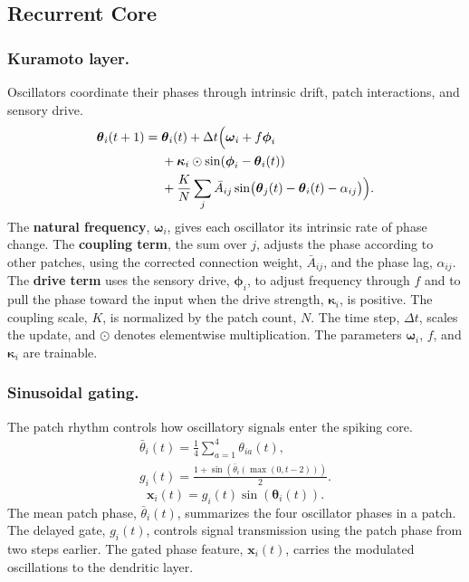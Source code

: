 \subsection{Recurrent Core}

\subsubsection{Kuramoto layer.}
Oscillators coordinate their phases through intrinsic drift, patch interactions, and sensory drive.
\begin{equation}
\begin{aligned}
\boldsymbol\theta_i(t+1)={}&\boldsymbol\theta_i(t)+\Delta t\Bigl(
\boldsymbol\omega_i+f\boldsymbol\phi_i\\
&+\boldsymbol\kappa_i\odot\sin(\boldsymbol\phi_i-\boldsymbol\theta_i(t))\\
&+\frac{K}{N}\sum_j\bar A_{ij}\sin\bigl(
\boldsymbol\theta_j(t)-\boldsymbol\theta_i(t)-\alpha_{ij}\bigr)\Bigr).
\end{aligned}
\end{equation}
The \textbf{natural frequency}, $\boldsymbol\omega_i$, gives each oscillator its intrinsic rate of
phase change. The \textbf{coupling term}, the sum over $j$, adjusts the phase according to other
patches, using the corrected connection weight, $\bar A_{ij}$, and the phase lag, $\alpha_{ij}$.
The \textbf{drive term} uses the sensory drive, $\boldsymbol\phi_i$, to adjust frequency through
$f$ and to pull the phase toward the input when the drive strength, $\boldsymbol\kappa_i$, is
positive. The coupling scale, $K$, is normalized by the patch count, $N$. The time step, $\Delta
t$, scales the update, and $\odot$ denotes elementwise multiplication. The parameters
$\boldsymbol\omega_i$, $f$, and $\boldsymbol\kappa_i$ are trainable.

\subsubsection{Sinusoidal gating.}
The patch rhythm controls how oscillatory signals enter the spiking core.
\begin{equation}
\begin{gathered}
\bar\theta_i(t)=\frac{1}{4}\sum_{a=1}^4\theta_{ia}(t),\\
g_i(t)=\frac{1+\sin(\bar\theta_i(\max(0,t-2)))}{2}.
\end{gathered}
\end{equation}
\begin{equation}
\boldsymbol x_i(t)=g_i(t)\sin(\boldsymbol\theta_i(t)).
\end{equation}
The mean patch phase, $\bar\theta_i(t)$, summarizes the four oscillator phases in a patch. The
delayed gate, $g_i(t)$, controls signal transmission using the patch phase from two steps earlier.
The gated phase feature, $\boldsymbol x_i(t)$, carries the modulated oscillations to the dendritic
layer.

